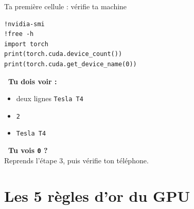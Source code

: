 \documentclass[11pt,a4paper]{article}
\begin{document}
\vspace{2pt}
\begin{bloc}[accentblue]{\faTerminal\quad Ta première cellule : vérifie ta machine}
\begin{minipage}[t]{0.55\linewidth}
\begin{lstlisting}
!nvidia-smi
!free -h
import torch
print(torch.cuda.device_count())
print(torch.cuda.get_device_name(0))
\end{lstlisting}
\end{minipage}\hfill
\begin{minipage}[t]{0.42\linewidth}
\vspace{2pt}
\textbf{\textcolor{accentblue}{\faCheckCircle\ Tu dois voir :}}
\begin{itemize}[leftmargin=1.2em,itemsep=1pt]
\item deux lignes \texttt{Tesla T4}
\item \texttt{2}
\item \texttt{Tesla T4}
\end{itemize}
\textbf{\textcolor{sectioncolor}{\faTimesCircle\ Tu vois \texttt{0} ?}}\\
Reprends l'étape 3, puis vérifie ton téléphone.
\end{minipage}
\end{bloc}

\newpage
\section{Les 5 règles d'or du GPU}
\end{document}
